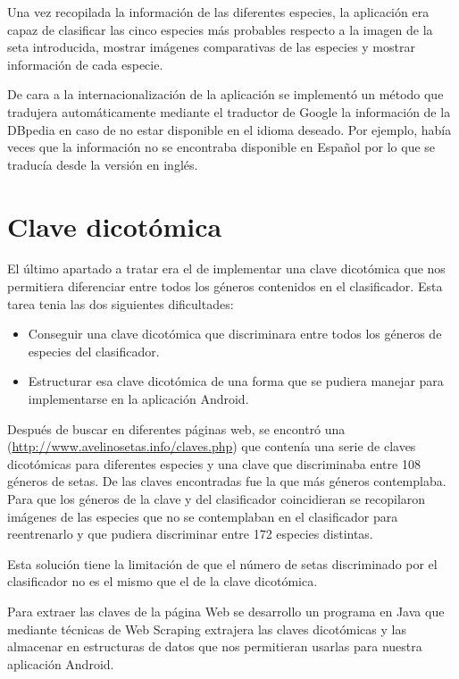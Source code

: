 Una vez recopilada la información de las diferentes especies, la aplicación era capaz de clasificar las cinco especies más probables respecto a la imagen de la seta introducida, mostrar imágenes comparativas de las especies y mostrar información de cada especie.

De cara a la internacionalización de la aplicación se implementó un método que tradujera automáticamente mediante el traductor de Google la información de la DBpedia en caso de no estar disponible en el idioma deseado. Por ejemplo, había veces que la información no se encontraba disponible en Español por lo que se traducía desde la versión en inglés.

\section{Clave dicotómica}

El último apartado a tratar era el de implementar una clave dicotómica que nos permitiera diferenciar entre todos los géneros contenidos en el clasificador. Esta tarea tenia las dos siguientes dificultades:

\begin{itemize}
	\item Conseguir una clave dicotómica que discriminara entre todos los géneros de especies del clasificador.
	\item Estructurar esa clave dicotómica de una forma que se pudiera manejar para implementarse en la aplicación Android.
\end{itemize}

Después de buscar en diferentes páginas web, se encontró una (\url{http://www.avelinosetas.info/claves.php}) que contenía una serie de claves dicotómicas para diferentes especies y una clave que discriminaba entre 108 géneros de setas. De las claves encontradas fue la que más géneros contemplaba. Para que los géneros de la clave y del clasificador coincidieran se recopilaron imágenes de las especies que no se contemplaban en el clasificador para reentrenarlo y que pudiera discriminar entre 172 especies distintas.

Esta solución tiene la limitación de que el número de setas discriminado por el clasificador no es el mismo que el de la clave dicotómica.

Para extraer las claves de la página Web se desarrollo un programa en Java que mediante técnicas de Web Scraping extrajera las claves dicotómicas y las almacenar en estructuras de datos que nos permitieran usarlas para nuestra aplicación Android.

